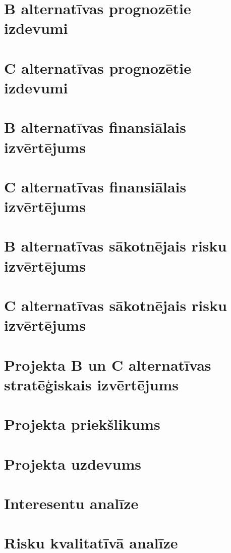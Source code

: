 \section{B alternatīvas prognozētie izdevumi}
\label{app:B_izdevumi}
    \clearpage
\section{C alternatīvas prognozētie izdevumi}
\label{app:C_izdevumi}
    \clearpage
\section{B alternatīvas finansiālais izvērtējums}
\label{app:B_finansialais_vertejums}
    \clearpage
\section{C alternatīvas finansiālais izvērtējums}
\label{app:C_finansialais_vertejums}
    \clearpage
\section{B alternatīvas sākotnējais risku izvērtējums}
\label{app:B_sakotnejie_riski}
    \clearpage
\section{C alternatīvas sākotnējais risku izvērtējums}
\label{app:C_sakotnejie_riski}
    \clearpage
\section{Projekta B un C alternatīvas stratēģiskais izvērtējums}
\label{app:B_C_strategiskais_vertejums}
    \clearpage
\section{Projekta priekšlikums}
\label{app:Projekta_priekslikums}
    \clearpage
\section{Projekta uzdevums}
\label{app:Projekta_uzdevums}
    \clearpage
\section{Interesentu analīze}
\label{app:Projekta_interesentu_analize}
    \clearpage
\section{Risku kvalitatīvā analīze}
\label{app:Projekta_risku_analize}
    \clearpage
